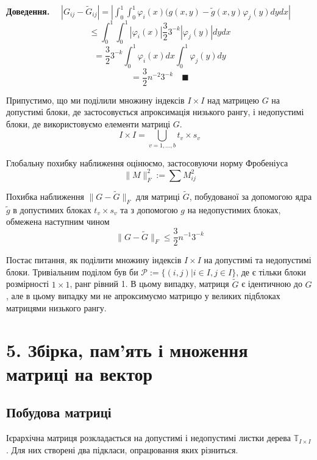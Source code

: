 \documentclass[12pt]{report}
\begin{document}
	{\bf Доведення.} $\quad|G_{ij}-\tilde{G}_{ij}|=|\int_{0}^{1}\int_{0}^{1}\varphi_i(x)(g(x,y)-\tilde{g}(x,y)\varphi_j(y)dydx|$
	$$\le \int_{0}^{1}\int_{0}^{1}|\varphi_i(x)|\frac{3}{2}3^{-k}|\varphi_j(y)|dydx$$
	$$=\frac{3}{2}3^{-k}\int_{0}^{1}\varphi_i(x)dx\int_{0}^{1}\varphi_j(y)dy$$
	$$= \frac{3}{2}n^{-2}3^{-k} \quad\blacksquare$$ 
	\par Припустимо, що ми поділили множину індексів $I\times I$ над матрицею $G$ на допустимі блоки, де застосовується апроксимація низького рангу, і недопустимі блоки, де використовуємо елементи матриці $G$.
	$$I\times I=\bigcup_{v=1,\dots,b}t_v\times s_v$$
	\par Глобальну похибку наближення оцінюємо, застосовуючи норму Фробеніуса 
	$$\|M\|^2_F:=\sum M_{ij}^2$$
	\begin{Lem}
	Похибка наближення $\|G-\tilde{G}\|_F$ для матриці $\tilde{G}$, побудованої за допомогою ядра $\tilde{g}$ в допустимих блоках $t_v\times s_v$ та з допомогою $g$ на недопустимих блоках, обмежена наступним чином
	$$\|G-\tilde{G}\|_F\le \frac{3}{2}n^{-1}3^{-k}$$
	\end{Lem}
	\par Постає питання, як поділити множину індексів $I\times I$ на допустимі та недопустимі блоки. Тривіальним поділом був би $\mathcal{P}:=\{(i,j)|i\in I,j\in I\}$, де є тільки блоки розмірності $1\times 1$, ранг рівний 1. В цьому випадку, матриця $\tilde{G}$ є ідентичною до $G$, але в цьому випадку ми не апроксимуємо матрицю у великих підблоках матрицями низького рангу. 
	\chapter{5. Збірка, пам'ять і множення матриці на вектор}
	\section{Побудова матриці}
	\hspace{0.8cm} Ієрархічна матриця розкладається на допустимі і недопустимі листки дерева $\mathbb{T}_{I\times I}$. Для них створені два підкласи, опрацювання яких різниться.
\end{document}
